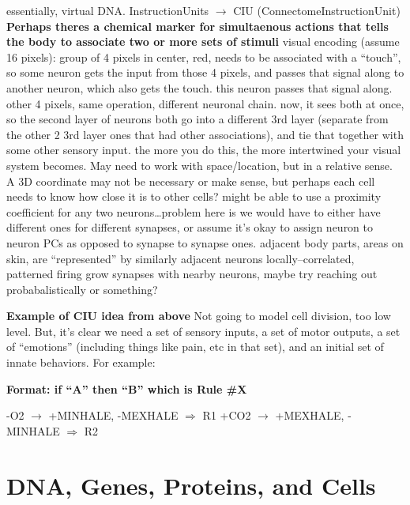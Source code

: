 \documentclass[11pt, a4paper, oneside]{article}   	%
\begin{document}
\begin{outline}
    \subpoint essentially, virtual DNA.
        \subsubpoint InstructionUnits $\rightarrow$ CIU (ConnectomeInstructionUnit)
  \point \textbf{Perhaps theres a chemical marker for simultaenous actions that tells the body to associate two or more sets of stimuli}
  \point visual encoding (assume 16 pixels):
    \subpoint group of 4 pixels in center, red, needs to be associated with a ``touch'', so some neuron gets the input from those 4 pixels, and passes that signal along to another neuron, which also gets the touch. this neuron passes that signal along.
    \subpoint other 4 pixels, same operation, different neuronal chain.
    \subpoint now, it sees both at once, so the second layer of neurons both go into a different 3rd layer (separate from the other 2 3rd layer ones that had other associations), and tie that together with some other sensory input.
    \subpoint the more you do this, the more intertwined your visual system becomes.
\point May need to work with space/location, but in a relative sense. A 3D coordinate may not be necessary or make sense, but perhaps each cell needs to know how close it is to other cells?
    \subpoint might be able to use a proximity coefficient for any two neurons\ldots problem here is we would have to either have different ones for different synapses, or assume it's okay to assign neuron to neuron PCs as opposed to synapse to synapse ones.
    \subpoint adjacent body parts, areas on skin, are ``represented'' by similarly adjacent neurons
\point locally--correlated, patterned firing 
\point grow synapses with nearby neurons, maybe try reaching out probabalistically or something?
\end{outline}

\textbf{Example of CIU idea from above}
Not going to model cell division, too low level. But, it's clear we need a set of sensory inputs, a set of motor outputs, a set of ``emotions'' (including things like pain, etc in that set), and an initial set of innate behaviors. For example:

\textbf{Format: if ``A'' then ``B'' which is Rule \#X}
\begin{outline}
\point -O2 $\rightarrow$ +MINHALE, -MEXHALE $\Rightarrow$ R1
\point +CO2 $\rightarrow$ +MEXHALE, -MINHALE $\Rightarrow$ R2
\end{outline}


\section{DNA, Genes, Proteins, and Cells}
\end{document}
